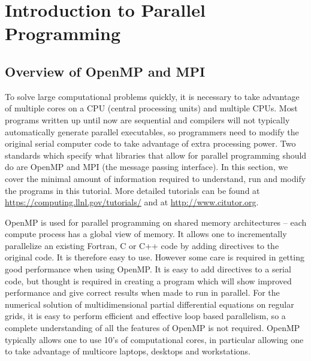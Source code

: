 \chapter{Introduction to Parallel Programming}
\section{Overview of OpenMP and MPI}

To solve large computational problems quickly, it is necessary to take advantage of multiple cores on a CPU (central processing units) and multiple CPUs. Most programs written up until now are sequential and compilers will not typically automatically generate parallel executables,  so programmers need to modify the original serial computer code to take advantage of extra processing power. Two standards which specify what libraries that allow for parallel programming should do are OpenMP and MPI (the message passing interface). In this section, we cover the minimal amount of information required to understand, run and modify the programs in this tutorial. More detailed tutorials can be found at \url{https://computing.llnl.gov/tutorials/} and at \url{http://www.citutor.org}.

OpenMP is used for parallel programming on shared memory architectures -- each compute process has a global view of memory. It allows one to incrementally parallelize an existing Fortran, C or C++ code by adding directives to the original code. It is therefore easy to use. However some care is required in getting good performance when using OpenMP. It is easy to add directives to a serial code, but thought is required in creating a program which will show improved performance and give correct results when made to run in parallel. For the numerical solution of multidimensional partial differential equations on regular grids, it is easy to perform efficient and effective loop based parallelism, so a complete understanding of all the features of OpenMP is not required. OpenMP typically allows one to use 10's of computational cores, in particular allowing one to take advantage of multicore laptops, desktops and workstations.

